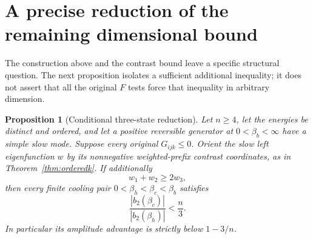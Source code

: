 \documentclass[11pt]{article}
\newtheorem{proposition}{Proposition}
\begin{document}
\section{A precise reduction of the remaining dimensional bound}
\label{sec:highdimboundreduction}
The construction above and the contrast bound leave a specific structural
question. The next proposition isolates a sufficient additional inequality;
it does not assert that all the original $F$ tests force that inequality
in arbitrary dimension.

\begin{proposition}[Conditional three-state reduction]
\label{prop:highdimboundreduction}
Let $n\geq4$, let the energies be distinct and ordered, and let a positive
reversible generator at $0<\beta_b<\infty$ have a simple slow mode.
Suppose every original $G_{ijk}\leq0$. Orient the slow left eigenfunction
$w$ by its nonnegative weighted-prefix contrast coordinates, as in
Theorem~\ref{thm:orderedk}. If additionally
\begin{equation}\label{eq:highdimarithmetic}
w_1+w_2\geq2w_3,
\end{equation}
then every finite cooling pair $0<\beta_h<\beta_c<\beta_b$ satisfies
\[
\frac{|b_2(\beta_c)|}{|b_2(\beta_h)|}<\frac n3.
\]
In particular its amplitude advantage is strictly below $1-3/n$.
\end{proposition}
\end{document}
